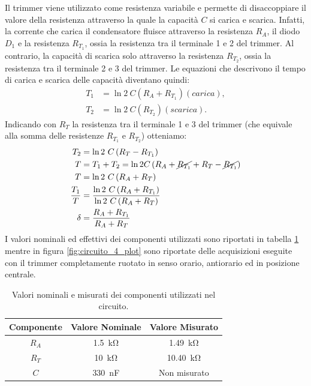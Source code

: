 \noindent
Il trimmer viene utilizzato come resistenza variabile e permette di disaccoppiare il valore della resistenza attraverso la quale la capacità $C$ si carica e scarica. Infatti, la corrente che carica il condensatore fluisce attraverso la resistenza $R_A$, il diodo $D_1$ e la resistenza $R_{T_1}$, ossia la resistenza tra il terminale 1 e 2 del trimmer. Al contrario, la capacità di scarica solo attraverso la resistenza $R_{T_2}$, ossia la resistenza tra il terminale 2 e 3 del trimmer. Le equazioni che descrivono il tempo di carica e scarica delle capacità diventano quindi:
\begin{equation}
	\begin{split}
		T_1&=\ln{2}\ C\left(R_A+R_{T_1}\right) (carica),\\
		T_2&=\ln{2}\ C\left(R_{T_2}\right) (scarica).
	\end{split}
\end{equation}
Indicando con $R_T$ la resistenza tra il terminale 1 e 3 del trimmer (che equivale alla somma delle resistenze $R_{T_1}$ e $R_{T_2}$) otteniamo:
\begin{equation}
	\begin{split}
		T_2&=\ln{2}\ C\left(R_T-R_{T_1}\right) \\
		T&=T_1+T_2=\ln{2} C\left(R_A+\cancel{R_{T_1}}+R_T-\cancel{R_{T_1}}\right) \\
		T&=\ln{2}\ C\left(R_A+R_T\right) \\
		\frac{T_1}{T}&=\frac{\ln{2}\ C\left(R_A+R_{T_1}\right)}{\ln{2}\ C\left(R_A+R_T\right)} \\
		\delta&=\frac{R_A+R_{T_1}}{R_A+R_T}
	\end{split}
\end{equation}
I valori nominali ed effettivi dei componenti utilizzati sono riportati in tabella \ref{tab:valori_componenti_5} mentre in figura \ref{fig:circuito_4_plot} sono riportate delle acquisizioni eseguite con il trimmer completamente ruotato in senso orario, antiorario ed in posizione centrale.
\begin{table}[h!]
	\centering
	\begin{tabular}{|c|c|c|}
		\hline
		Componente	& Valore Nominale & Valore Misurato \\ \hline
		$R_A$ &\SI{1.5}{\kilo\ohm} & \SI{1.49}{\kilo\ohm} \\ \hline
		$R_T$ &\SI{10}{\kilo\ohm} & \SI{10.40}{\kilo\ohm} \\ \hline
		$C$ & \SI{330}{\nano\farad} & Non misurato \\ \hline
	\end{tabular}
	\caption{Valori nominali e misurati dei componenti utilizzati nel circuito.}
	\label{tab:valori_componenti_5}
\end{table}
